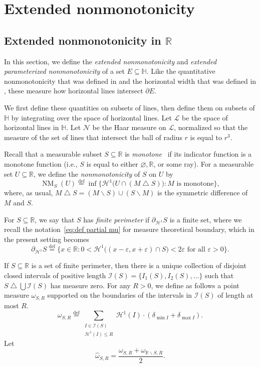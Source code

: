 \documentclass[11pt,reqno]{amsart}
\renewcommand{\H}{\mathbb{H}}
\newcommand{\R}{\mathbb{R}}
\newcommand{\cH}{\mathcal{H}}
\newcommand{\cI}{\mathcal{I}}
\newcommand{\cL}{\mathcal{L}}
\newcommand{\cN}{\mathcal{N}}
\renewcommand{\epsilon}{\varepsilon}
\newcommand{\0}{\mathbf{0}}
\renewcommand{\1}{\mathbf 1}
\newcommand{\symdiff}{\mathbin{\triangle}}
\renewcommand{\mid}{:}
\renewcommand{\subset}{\subseteq}
\newcommand{\eqdef}{\stackrel{\mathrm{def}}{=}}
\renewcommand{\le}{\leqslant}
\renewcommand{\setminus}{\smallsetminus}
\renewcommand{\emptyset}{\varnothing}
\theoremstyle{remark}
\DeclareMathOperator{\NM}{NM}
\begin{document}
\section{Extended nonmonotonicity}\label{sec:parametric monotonicity}

\subsection{Extended nonmonotonicity in $\R$}\label{sec:parametric monotonicity R}

In this section, we define the \emph{extended nonmonotonicity} and \emph{extended parameterized nonmonotonicity} of a set $E\subset \H$.  Like the quantitative  nonmonotonicity that was defined  in \cite{CKN} and the horizontal width that was defined in \cite{FasslerOrponenRigot18}, these measure how horizontal lines intersect $\partial E$.

We first define these quantities on subsets of lines, then define them on subsets of $\H$ by integrating over the space of horizontal lines.  Let $\cL$ be the space of horizontal lines in $\H$.  Let $\cN$ be the Haar measure on $\cL$, normalized so that the measure of the set of lines that intersect the ball of radius $r$ is equal to $r^3$.

Recall that a measurable subset $S\subset \R$ is \emph{monotone}~\cite{CheegerKleinerMetricDiff} if its indicator function is a monotone function (i.e., $S$ is equal to either $\emptyset, \R$, or some ray).  For a measurable set $U\subset \R$, we define the \emph{nonmonotonicity} of $S$ on $U$ by
\[\NM_S(U)\eqdef  \inf\big\{\cH^1\big(U\cap(M\symdiff S)\big) \mid M \text{ is monotone}\big\},\]
where, as usual, $M\symdiff S=(M\setminus S) \cup (S\setminus M)$ is the symmetric difference of $M$ and $S$.

For $S\subset \R$, we say that $S$ has \emph{finite perimeter} if $\partial_{\cH^1} S$ is a finite set, where we recall the notation~\eqref{eq:def partial mu} for  measure theoretical boundary, which in the present setting becomes
$$\partial_{\cH^1} S\eqdef \big\{x\in \R\mid 0<\cH^1\big((x-\epsilon, x+\epsilon)\cap S\big)<2\epsilon \text{ for all }\epsilon>0\big\}.$$





If $S\subset \R$ is a set of finite perimeter, then there is a unique collection of disjoint closed intervals of positive length $\cI(S)=\{I_1(S),I_2(S),\dots\}$ such that $S\symdiff \bigcup \cI(S)$ has measure zero.  For any $R>0$, we define as follows a point measure $\omega_{S,R}$ supported on the boundaries of the intervals in $\cI(S)$ of length at most $R$.
$$\omega_{S,R}\eqdef \sum_{\substack{I\in \cI(S)\\ \cH^1(I)\le R}} \cH^1(I) \cdot (\delta_{\min I}+\delta_{\max I}).$$
Let
$$\widehat{\omega}_{S,R}=\frac{\omega_{S,R}+\omega_{\R\setminus S,R}}{2}.$$
\end{document}
